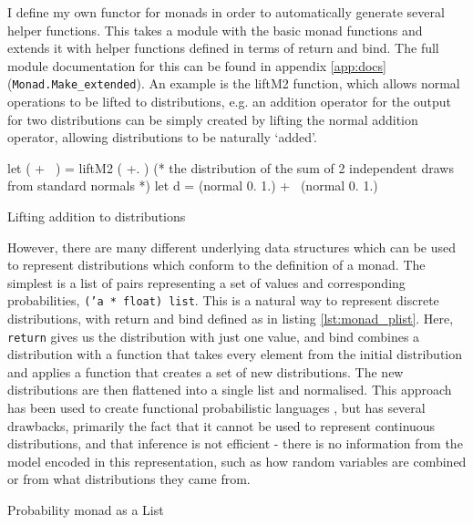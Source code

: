 I define my own functor for monads in order to automatically generate several helper functions. This takes a module with the basic monad functions and extends it with helper functions defined in terms of return and bind. The full module documentation for this can be found in appendix \ref{app:docs} (\texttt{Monad.Make\_extended}). An example is the liftM2 function, which allows normal operations to be lifted to distributions, e.g. an addition operator for the output for two distributions can be simply created by lifting the normal addition operator, allowing distributions to be naturally `added'.

\begin{listing}
\begin{ocamlcode-in}
let ( +~ ) = liftM2 ( +. )
(* the distribution of the sum of 2 independent draws from standard normals *)
let d = (normal 0. 1.) +~ (normal 0. 1.)
\end{ocamlcode-in}
\caption{Lifting addition to distributions}
\end{listing}

However, there are many different underlying data structures which can be used to represent distributions which conform to the definition of a monad. The simplest is a list of pairs representing a set of values and corresponding probabilities, \texttt{('a * float) list}. This is a natural way to represent discrete distributions, with return and bind defined as in listing \ref{lst:monad_plist}. Here, \texttt{return} gives us the distribution with just one value, and bind combines a distribution with a function that takes every element from the initial distribution and applies a function that creates a set of new distributions. The new distributions are then flattened into a single list and normalised. This approach has been used to create functional probabilistic languages \cite{erwig}, but has several drawbacks, primarily the fact that it cannot be used to represent continuous distributions, and that inference is not efficient - there is no information from the model encoded in this representation, such as how random variables are combined or from what distributions they came from.

\begin{listing}[!ht]
	\caption{Probability monad as a List}
	\label{lst:monad_plist}
\end{listing}

